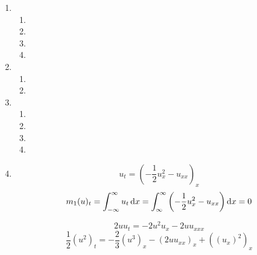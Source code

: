 \documentclass[a4paper,11pt]{scrartcl}
\newcommand*{\dx}{\dif{}x}
\begin{document}
\begin{enumerate}[label*=\textbf{8.\arabic*.}]
\begin{enumerate}
\end{enumerate}

\item \begin{enumerate}
  \item
  \item
  \item
  \item
\end{enumerate}

\item \begin{enumerate}
  \item
  \item
\end{enumerate}

\item \begin{enumerate}
  \item
  \item
  \item
  \item
\end{enumerate}

\item
  \[u_t = \left(-\frac{1}{2} u^2_x - u_{xx}\right)_x\]
  \[m_1(u)_t = \int_{-\infty}^{\infty} u_t \dx = \int_{\infty}^\infty
    \left(-\frac{1}{2} u^2_x - u_{xx}\right)\dx = 0\]

  \[ 2u u_t = - 2 u^2 u_x - 2 u u_{xxx} \]
  \[ \frac{1}{2} (u^2)_t = - \frac{2}{3} (u^3)_x - (2u u_{xx})_x + ((u_x)^2)_x \]

\end{enumerate}
\end{document}
